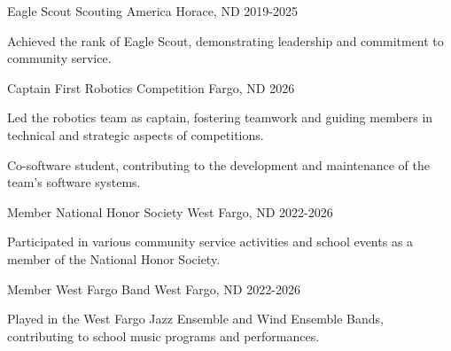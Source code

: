 

\begin{cventries}

  \cventry
    {Eagle Scout} %
    {Scouting America} %
    {Horace, ND} %
    {2019-2025} %
    {
      \begin{cvitems} %
        \item {Achieved the rank of Eagle Scout, demonstrating leadership and commitment to community service.}
      \end{cvitems}
    }

  \cventry
    {Captain} %
    {First Robotics Competition} %
    {Fargo, ND} %
    {2026} %
    {
      \begin{cvitems} %
        \item {Led the robotics team as captain, fostering teamwork and guiding members in technical and strategic aspects of competitions.}
        \item {Co-software student, contributing to the development and maintenance of the team's software systems.}
      \end{cvitems}
    }

  \cventry
    {Member} %
    {National Honor Society} %
    {West Fargo, ND} %
    {2022-2026} %
    {
      \begin{cvitems} %
        \item {Participated in various community service activities and school events as a member of the National Honor Society.}
      \end{cvitems}
    }

  \cventry
    {Member} %
    {West Fargo Band} %
    {West Fargo, ND} %
    {2022-2026} %
    {
      \begin{cvitems} %
        \item {Played in the West Fargo Jazz Ensemble and Wind Ensemble Bands, contributing to school music programs and performances.}
      \end{cvitems}
    }

\end{cventries}
